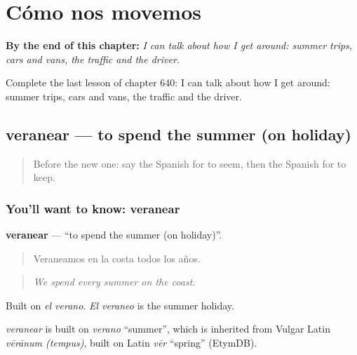 
\chapter{Cómo nos movemos}
\label{ch:es-como-nos-movemos}

\begin{chapteropening}
\textbf{By the end of this chapter:} \emph{I can talk about how I get around: summer trips, cars and vans, the traffic and the driver.}

Complete the last lesson of chapter 640: I can talk about how I get around: summer trips, cars and vans, the traffic and the driver.
\end{chapteropening}

\section[veranear]{veranear — to spend the summer (on holiday)}

\label{lesson:ES-C640-veranear}



\begin{quote}
Before the new one: say the Spanish for to seem, then the Spanish for to keep.
\end{quote}

\subsection*{You'll want to know: veranear}
\textbf{veranear} — \textquotedblleft{}to spend the summer (on holiday)\textquotedblright{}.

\begin{quote}
Veraneamos en la costa todos los años.
\end{quote}

\begin{quote}
\emph{We spend every summer on the coast.}
\end{quote}

Built on \emph{el verano}. \emph{El veraneo} is the summer holiday.

\begin{cousinweb}
\emph{veranear} is built on \emph{verano} \textquotedblleft{}summer\textquotedblright{}, which is inherited from Vulgar Latin \emph{vērānum (tempus)}, built on Latin \emph{vēr} \textquotedblleft{}spring\textquotedblright{} (EtymDB).
\end{cousinweb}

